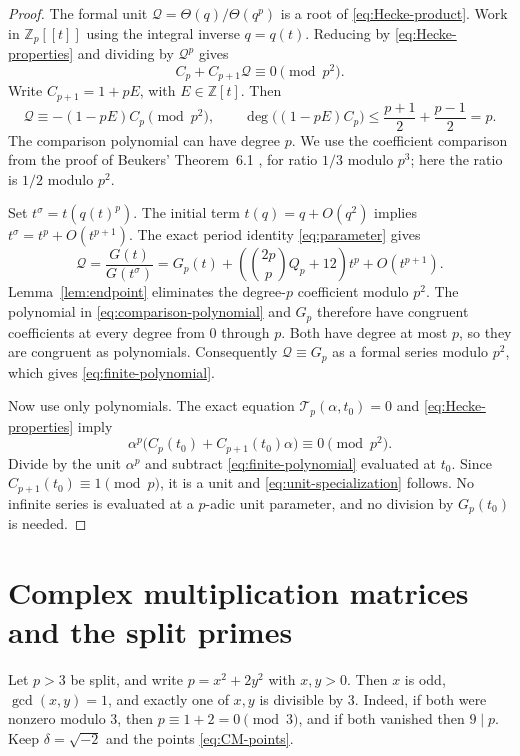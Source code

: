 \documentclass[11pt,a4paper]{article}
\theoremstyle{remark}
\newcommand{\Z}{\mathbb Z}\newcommand{\Q}{\mathbb Q}
\newcommand{\Tp}{\mathcal T_p}
\begin{document}
\begin{proof}
The formal unit $\mathcal Q=\Theta(q)/\Theta(q^p)$ is a root of
\eqref{eq:Hecke-product}. Work in $\Z_p[[t]]$ using the integral
inverse $q=q(t)$.
Reducing by \eqref{eq:Hecke-properties} and dividing by
$\mathcal Q^p$ gives
\[
 C_p+C_{p+1}\mathcal Q\equiv0\pmod{p^2}.
\]
Write $C_{p+1}=1+pE$, with $E\in\Z[t]$.
Then
\begin{equation}\label{eq:comparison-polynomial}
 \mathcal Q\equiv-(1-pE)C_p\pmod{p^2},\qquad
 \deg\bigl((1-pE)C_p\bigr)
 \le\frac{p+1}{2}+\frac{p-1}{2}=p.
\end{equation}
The comparison polynomial can have degree $p$. We use the coefficient
comparison from the proof of Beukers' Theorem~6.1 \cite{beukers}, for ratio $1/3$
modulo $p^3$; here the ratio is $1/2$ modulo $p^2$.

Set $t^\sigma=t(q(t)^p)$.
The initial term $t(q)=q+O(q^2)$ implies
$t^\sigma=t^p+O(t^{p+1})$.
The exact period identity \eqref{eq:parameter} gives
\begin{equation}\label{eq:boundary-series}
 \mathcal Q=\frac{G(t)}{G(t^\sigma)}
 =G_p(t)+\left(\binom{2p}p Q_p+12\right)t^p+O(t^{p+1}).
\end{equation}
Lemma~\ref{lem:endpoint} eliminates the degree-$p$ coefficient modulo $p^2$.
The polynomial in \eqref{eq:comparison-polynomial} and $G_p$
therefore have congruent coefficients at every degree from $0$
through $p$. Both have degree at most $p$, so they are congruent
as polynomials. Consequently $\mathcal Q\equiv G_p$ as a formal
series modulo $p^2$, which gives \eqref{eq:finite-polynomial}.

Now use only polynomials. The exact equation $\Tp(\alpha,t_0)=0$
and \eqref{eq:Hecke-properties} imply
\[
 \alpha^p\bigl(C_p(t_0)+C_{p+1}(t_0)\alpha\bigr)
 \equiv0\pmod{p^2}.
\]
Divide by the unit $\alpha^p$ and subtract
\eqref{eq:finite-polynomial} evaluated at $t_0$.
Since $C_{p+1}(t_0)\equiv1\pmod p$, it is a unit and
\eqref{eq:unit-specialization} follows.
No infinite series is evaluated at a $p$-adic unit parameter,
and no division by $G_p(t_0)$ is needed.
\end{proof}

\section{Complex multiplication matrices and the split primes}
\label{sec:split}
Let $p>3$ be split, and write $p=x^2+2y^2$ with $x,y>0$.
Then $x$ is odd, $\gcd(x,y)=1$, and exactly one of $x,y$ is
divisible by $3$. Indeed, if both were nonzero modulo $3$, then
$p\equiv1+2=0\pmod3$, and if both vanished then $9\mid p$.
Keep $\delta=\sqrt{-2}$ and the points \eqref{eq:CM-points}.
\end{document}
